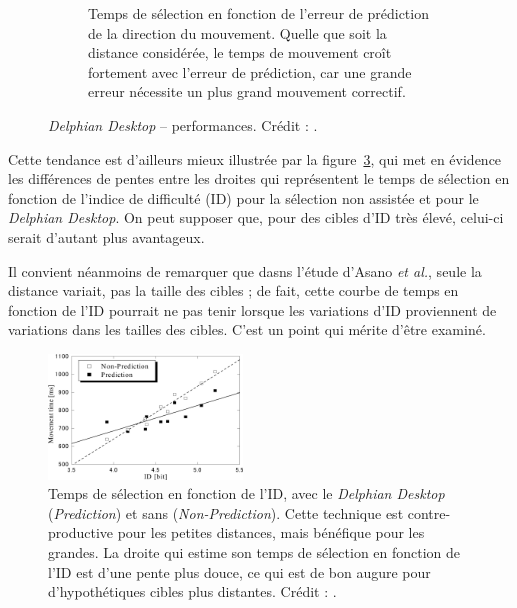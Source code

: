 \begin{figure}[!htb]
\begin{subfigure}[t]{0.49\textwidth}
			\caption{Temps de sélection en fonction de l'erreur de prédiction de la direction du mouvement. Quelle que soit la distance considérée, le temps de mouvement croît fortement avec l'erreur de prédiction, car une grande erreur nécessite un plus grand mouvement correctif.}
			\label{fig:delphianTimesErrors}
		\end{subfigure}
		\caption[\emph{Delphian Desktop} -- performances]{\emph{Delphian Desktop} -- performances. Crédit : \cite{asano2005predictive}.}
		\label{fig:plop}
	\end{figure}

	Cette tendance est d'ailleurs mieux illustrée par la figure~\ref{fig:delphianTimesID}, qui met en évidence les différences de pentes entre les droites qui représentent le temps de sélection en fonction de l'indice de difficulté (ID) pour la sélection non assistée et pour le \emph{Delphian Desktop}. On peut supposer que, pour des cibles d'ID très élevé, celui-ci serait d'autant plus avantageux.
	
	Il convient néanmoins de remarquer que dasns l'étude d'Asano \emph{et al.}, seule la distance variait, pas la taille des cibles ; de fait, cette courbe de temps en fonction de l'ID pourrait ne pas tenir lorsque les variations d'ID proviennent de variations dans les tailles des cibles. C'est un point qui mérite d'être examiné.

	\begin{figure} %
		\centering
		\includegraphics[width=0.46\textwidth]{figures/ch2/delphianTimesID}
		\caption[\emph{Delphian Desktop} -- temps de sélection en fonction de l'ID]{Temps de sélection en fonction de l'ID, avec le \emph{Delphian Desktop} (\emph{Prediction}) et sans (\emph{Non-Prediction}). Cette technique est contre-productive pour les petites distances, mais bénéfique pour les grandes. La droite qui estime son temps de sélection en fonction de l'ID est d'une pente plus douce, ce qui est de bon augure pour d'hypothétiques cibles plus distantes. Crédit : \cite{asano2005predictive}.}
		\label{fig:delphianTimesID}
	\end{figure}
	
